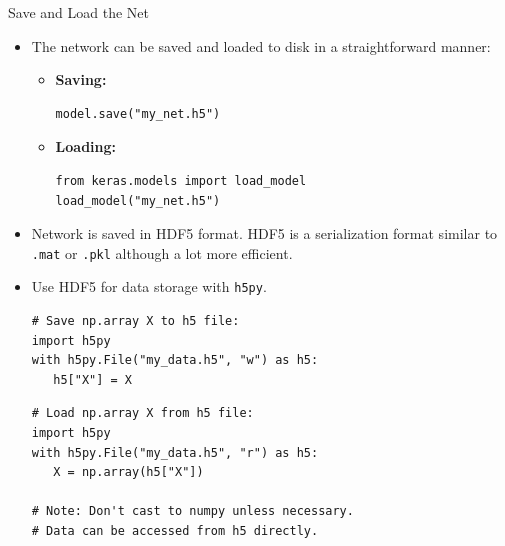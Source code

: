\documentclass[10pt, aspectratio=169]{beamer} %
\begin{document}
\begin{frame}[fragile]{Save and Load the Net}
\begin{itemize}
	\item The network can be saved and loaded to disk in a straightforward manner:
	\begin{itemize}
		\item \textbf{Saving:}
\begin{lstlisting}
model.save("my_net.h5")
\end{lstlisting}
		\item \textbf{Loading:} 
\begin{lstlisting}
from keras.models import load_model
load_model("my_net.h5")
\end{lstlisting}
\end{itemize}
\item Network is saved in HDF5 format.
HDF5 is a serialization format similar to \verb+.mat+ or \verb+.pkl+
although a lot more efficient.
\item Use HDF5 for data storage with \verb+h5py+.
\begin{lstlisting}
# Save np.array X to h5 file:
import h5py
with h5py.File("my_data.h5", "w") as h5:
   h5["X"] = X
\end{lstlisting}

\begin{lstlisting}
# Load np.array X from h5 file:
import h5py
with h5py.File("my_data.h5", "r") as h5:
   X = np.array(h5["X"])
	
# Note: Don't cast to numpy unless necessary.
# Data can be accessed from h5 directly.
\end{lstlisting}

\end{itemize}
\end{frame}
\end{document}
